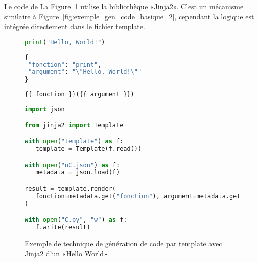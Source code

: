 Le code de La Figure~\ref{fig:exemple_gen_code_basique_template} utilise la bibliothèque «Jinja2». C'est un mécanisme similaire à Figure~\ref{fig:exemple_gen_code_basique_2}, cependant la logique est intégrée directement dans le fichier template.

\begin{figure}
\begin{lstlisting}[language=Python, upquote=true, caption={C - fichier C.py de Figure~\ref{fig:exemple_gen_code_basique_template}}, label={lst:gen_code_template_c}]
print("Hello, World!")
\end{lstlisting}

\begin{lstlisting}[language=Python, upquote=true, caption={µ$_C$ - fichier uC.json de Figure~\ref{fig:exemple_gen_code_basique_template}}, label={lst:gen_code_template_uc}]
{
 "fonction": "print",
 "argument": "\"Hello, World!\""
}
\end{lstlisting}

\begin{lstlisting}[language=Python, upquote=true, caption={template - fichier template de Figure~\ref{fig:exemple_gen_code_basique_template}}, label={lst:gen_code_template_template}]
{{ fonction }}({{ argument }})
\end{lstlisting}

\begin{lstlisting}[language=Python, upquote=true, caption={M(µ$_C$) de Figure~\ref{fig:exemple_gen_code_basique_template}}, label={lst:gen_code_template_m}]
import json

from jinja2 import Template

with open("template") as f:
   template = Template(f.read())

with open("uC.json") as f:
   metadata = json.load(f)

result = template.render(
   fonction=metadata.get("fonction"), argument=metadata.get("argument")
)

with open("C.py", "w") as f:
   f.write(result)
\end{lstlisting}
\caption{Exemple de technique de génération de code par template avec Jinja2 d'un «Hello World»}
\label{fig:exemple_gen_code_basique_template}
\end{figure}


